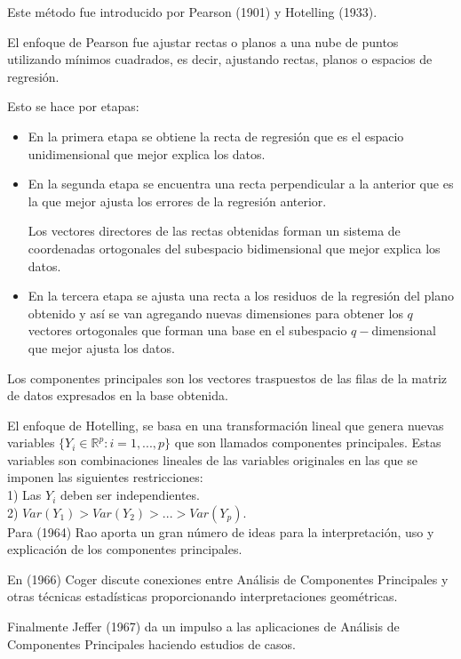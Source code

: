 \documentclass[12pt,letterpaper]{report} %
\begin{document}
Este método fue introducido por Pearson (1901) y Hotelling (1933).

El enfoque de Pearson fue ajustar rectas o planos a una nube de puntos utilizando mínimos cuadrados, es decir, ajustando rectas, planos o espacios de regresión. 

Esto se hace por etapas:
\begin{itemize}
\item En la primera etapa se obtiene la recta de regresión que es el espacio unidimensional que mejor explica los datos.
	
\item En la segunda etapa se encuentra una recta perpendicular a la anterior que es la que mejor ajusta los errores de la regresión anterior.
	
Los vectores directores de las rectas obtenidas forman un sistema de coordenadas ortogonales del subespacio bidimensional que mejor explica los datos.
	
\item En la tercera etapa se ajusta una recta a los residuos de la regresión del plano obtenido y así se van agregando nuevas dimensiones para obtener los $q$ vectores ortogonales que forman una base en el subespacio $q-$dimensional que mejor ajusta los datos.
\end{itemize}

Los componentes principales son los vectores traspuestos de las filas de la matriz de datos expresados en la base obtenida.

El enfoque de Hotelling, se basa en una transformación lineal que genera nuevas variables $\{ Y_i\in \mathbb{R}^p: i=1,...,p\}$ que son llamados componentes principales. Estas variables son combinaciones lineales de las variables originales en las que se imponen las siguientes restricciones: \\

1) Las $Y_i$ deben ser independientes. \\

2) $Var(Y_1)>Var(Y_2)>...>Var(Y_p)$. \\

Para (1964) Rao aporta un gran número de ideas para la interpretación, uso y explicación de los componentes principales.

En (1966) Coger discute conexiones entre Análisis de Componentes Principales y otras técnicas estadísticas proporcionando interpretaciones geométricas.

Finalmente Jeffer (1967) da un impulso a las aplicaciones de Análisis de Componentes Principales haciendo estudios de casos.
\end{document}
